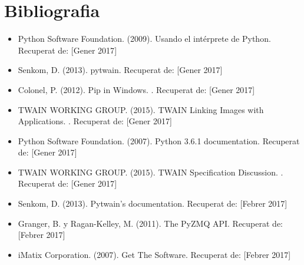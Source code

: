 \documentclass[letterpaper,11pt,catalan]{sphinxmanual}
\begin{document}
\chapter{Bibliografia}
\label{\detokenize{index:bibliografia}}\begin{itemize}
\item {} 
Python Software Foundation. (2009). Usando el intérprete de Python.  Recuperat de:  {[}Gener 2017{]}

\item {} 
Senkom, D. (2013). pytwain.  Recuperat de:  {[}Gener 2017{]}

\item {} 
Colonel, P. (2012). Pip in Windows. . Recuperat de:  {[}Gener 2017{]}

\item {} 
TWAIN WORKING GROUP. (2015). TWAIN Linking Images with Applications. . Recuperat de:  {[}Gener 2017{]}

\item {} 
Python Software Foundation. (2007). Python 3.6.1 documentation.  Recuperat de:  {[}Gener 2017{]}

\item {} 
TWAIN WORKING GROUP. (2015). TWAIN Specification Discussion. . Recuperat de:  {[}Gener 2017{]}

\item {} 
Senkom, D. (2013). Pytwain's documentation.  Recuperat de:  {[}Febrer 2017{]}

\item {} 
Granger, B. y Ragan-Kelley, M. (2011). The PyZMQ API.  Recuperat de:  {[}Febrer 2017{]}

\item {} 
iMatix Corporation. (2007). Get The Software.  Recuperat de:  {[}Febrer 2017{]}


\end{itemize}
\end{document}
